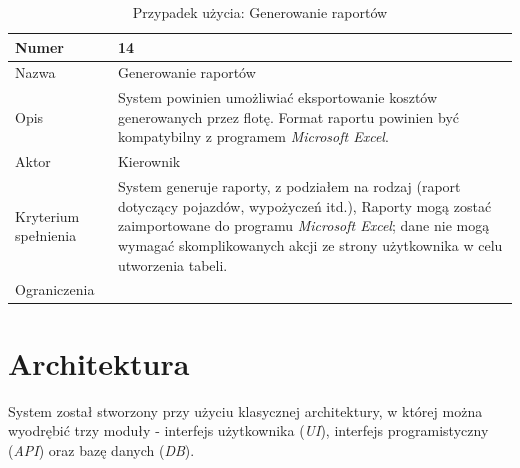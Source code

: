 \documentclass[eng,printmode,openany]{mgr}
\begin{document}
	\begin{table}[H]
		\caption{Przypadek użycia: Generowanie raportów}
		\begin{tabularx}{\textwidth}{|l|X|}
			\hline
			Numer                & 14  \\ \hline
			Nazwa                & Generowanie raportów \\ \hline
			Opis                 & System powinien umożliwiać eksportowanie kosztów generowanych przez flotę. Format raportu powinien być kompatybilny z programem \textit{Microsoft Excel}. \\ \hline
			Aktor                & Kierownik \\ \hline
			Kryterium spełnienia & System generuje raporty, z podziałem na rodzaj (raport dotyczący pojazdów, wypożyczeń itd.), Raporty mogą zostać zaimportowane do programu \textit{Microsoft Excel}; dane nie mogą wymagać skomplikowanych akcji ze strony użytkownika w celu utworzenia tabeli.\\ \hline
			Ograniczenia         &  \\ \hline
		\end{tabularx}
	\end{table}	

	\newpage
	\section{Architektura}
	System został stworzony przy użyciu klasycznej architektury, w której można wyodrębić trzy moduły - interfejs użytkownika (\textit{UI}), interfejs programistyczny (\textit{API}) oraz bazę danych (\textit{DB}). 
	
\end{document}
